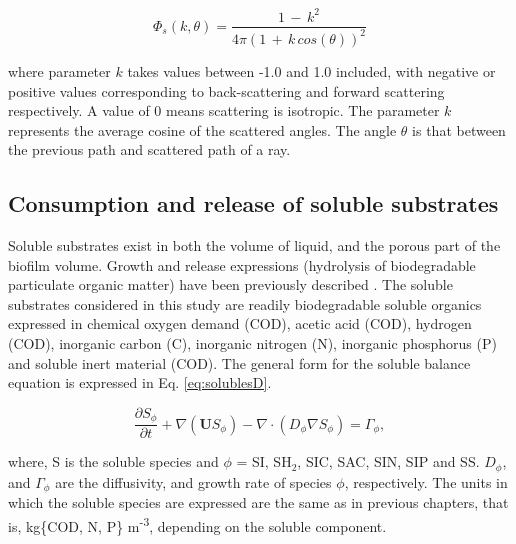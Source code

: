 \begin{equation}
\Phi_s(k, \theta) = \frac{1 \, -\,  k^2}{4\pi (1\, +\,k\, cos(\theta))^2 }
\end{equation}

where parameter $k$ takes values between -1.0 and 1.0 included, with negative or positive values corresponding to back-scattering and forward scattering respectively. A value of 0 means scattering is isotropic. The parameter $k$ represents the average cosine of the scattered angles. The angle $\theta$ is that between the previous path and scattered path of a ray.

\subsection{Consumption and release of soluble substrates}
Soluble substrates exist in both the volume of liquid, and the porous part of the biofilm volume. Growth and release expressions (hydrolysis of biodegradable particulate organic matter) have been previously described \cite{puyol2017}. The soluble substrates considered in this study are readily biodegradable soluble organics expressed in chemical oxygen demand (COD), acetic acid (COD), hydrogen (COD), inorganic carbon (C), inorganic nitrogen (N), inorganic phosphorus (P) and soluble inert material (COD). The general form for the soluble balance equation is expressed in Eq. \ref{eq:solublesD}.

\begin{equation}
\label{eq:solublesD}
\frac{\partial S_{\phi}}{\partial t} + \nabla (\mathbf{U} S_{\phi}) - \nabla \cdot (D_{\phi} \nabla S_{\phi}) = \Gamma_{\phi}, 
\end{equation}

where, S is the soluble species and ${\phi}$ = SI, SH${_2}$, SIC, SAC, SIN, SIP and SS. ${D_{\phi}}$, and ${\Gamma_{\phi}}$ are the diffusivity, and growth rate of species ${\phi}$, respectively. The units in which the soluble species are expressed are the same as in previous chapters, that is, kg\{COD, N, P\} m\textsuperscript{-3}, depending on the soluble component. 


